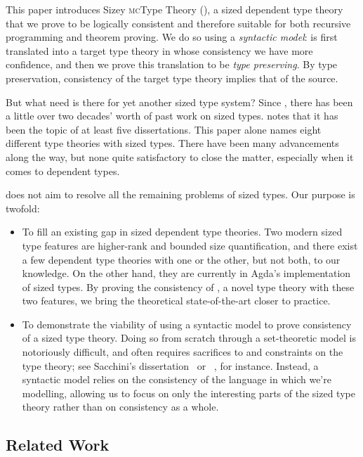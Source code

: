 \documentclass[acmsmall,review,anonymous]{acmart}\settopmatter{printfolios=true,printccs=false,printacmref=false}
\begin{document}
This paper introduces Sizey \textsc{mc}Type Theory (\lang),
a sized dependent type theory that we prove to be logically consistent
and therefore suitable for both recursive programming and theorem proving.
We do so using a \emph{syntactic model}:
\lang is first translated into a target type theory in whose consistency we have more confidence,
and then we prove this translation to be \emph{type preserving}.
By type preservation, consistency of the target type theory implies that of the source.

But what need is there for yet another sized type system?
Since \citet{hughes}, there has been a little over two decades' worth of past work on sized types.
\citet{flationary} notes that it has been the topic of at least five dissertations.
This paper alone names eight different type theories with sized types.
There have been many advancements along the way,
but none quite satisfactory to close the matter,
especially when it comes to dependent types.

\lang does not aim to resolve all the remaining problems of sized types.
Our purpose is twofold:

\begin{itemize}
  \item To fill an existing gap in sized dependent type theories.
    Two modern sized type features are higher-rank and bounded size quantification,
    and there exist a few dependent type theories with one or the other,
    but not both, to our knowledge.
    On the other hand, they are currently in Agda's implementation of sized types.
    By proving the consistency of \lang, a novel type theory with these two features,
    we bring the theoretical state-of-the-art closer to practice.
  \item To demonstrate the viability of using a syntactic model to prove consistency
    of a sized type theory.
    Doing so from scratch through a set-theoretic model is notoriously difficult,
    and often requires sacrifices to and constraints on the type theory;
    see Sacchini's dissertation~\citep{CIC-hat-minus} or \CIChatstar~\citep{CIC-hat-star},
    for instance.
    Instead, a syntactic model relies on the consistency of the language in which we're modelling,
    allowing us to focus on only the interesting parts of the sized type theory
    rather than on consistency as a whole.
\end{itemize}

\subsection{Related Work}
\end{document}
